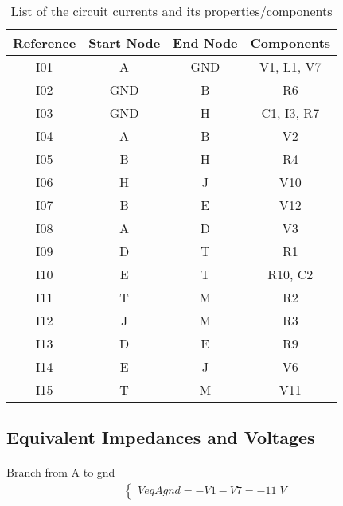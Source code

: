 \documentclass[a4paper]{article}
\begin{document}
\begin{table}[ht]
\caption{List of the circuit currents and its properties/components}
\centering
\begin{tabular}{cccc}
\textbf{Reference} & \textbf{Start Node} & \textbf{End Node} & \textbf{Components} \\ \hline
I01                & A                   & GND               & V1, L1, V7          \\
I02                & GND                 & B                 & R6                  \\
I03                & GND                 & H                 & C1, I3, R7          \\
I04                & A                   & B                 & V2                  \\
I05                & B                   & H                 & R4                  \\
I06                & H                   & J                 & V10                 \\
I07                & B                   & E                 & V12                 \\
I08                & A                   & D                 & V3                  \\
I09                & D                   & T                 & R1                  \\
I10                & E                   & T                 & R10, C2             \\
I11                & T                   & M                 & R2                  \\
I12                & J                   & M                 & R3                  \\
I13                & D                   & E                 & R9                  \\
I14                & E                   & J                 & V6                  \\
I15                & T                   & M                 & V11
\end{tabular}
\end{table}

\subsection{Equivalent Impedances and Voltages}
\paragraph{} Branch from A to gnd
\begin{gather*}
\begin{cases}
VeqAgnd =  - V1 - V7 = -11\;V
\end{cases}
\end{gather*}
\par
\end{document}

